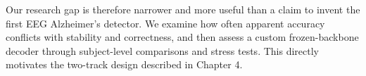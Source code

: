 Our research gap is therefore narrower and more useful than a claim to invent the first EEG Alzheimer's detector. We examine how often apparent accuracy conflicts with stability and correctness, and then assess a custom frozen-backbone decoder through subject-level comparisons and stress tests. This directly motivates the two-track design described in Chapter 4.\par
